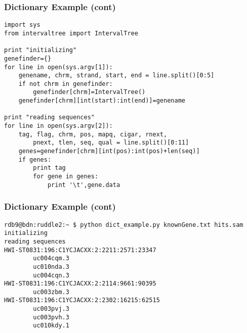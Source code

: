 \documentclass[10pt]{beamer}
\newcommand\smallfont{\fontsize{8pt}{7.2}\selectfont}
\begin{document}
\begin{frame}[fragile]
\frametitle{Dictionary Example (cont)}

\smallfont
\begin{verbatim}
import sys
from intervaltree import IntervalTree

print "initializing"
genefinder={}
for line in open(sys.argv[1]):
    genename, chrm, strand, start, end = line.split()[0:5]
    if not chrm in genefinder:
        genefinder[chrm]=IntervalTree()
    genefinder[chrm][int(start):int(end)]=genename

print "reading sequences"
for line in open(sys.argv[2]):
    tag, flag, chrm, pos, mapq, cigar, rnext, 
        pnext, tlen, seq, qual = line.split()[0:11]
    genes=genefinder[chrm][int(pos):int(pos)+len(seq)]
    if genes:
        print tag
        for gene in genes:
            print '\t',gene.data

\end{verbatim}
\end{frame}

\begin{frame}[fragile]
\frametitle{Dictionary Example (cont)}


\smallfont
\begin{verbatim}
rdb9@bdn:ruddle2:~ $ python dict_example.py knownGene.txt hits.sam
initializing
reading sequences
HWI-ST0831:196:C1YCJACXX:2:2211:2571:23347
        uc004cqm.3
        uc010nda.3
        uc004cqn.3
HWI-ST0831:196:C1YCJACXX:2:2114:9661:90395
        uc003zbm.3
HWI-ST0831:196:C1YCJACXX:2:2302:16215:62515
        uc003pvj.3
        uc003pvh.3
        uc010kdy.1
\end{verbatim}
\end{frame}
\end{document}
